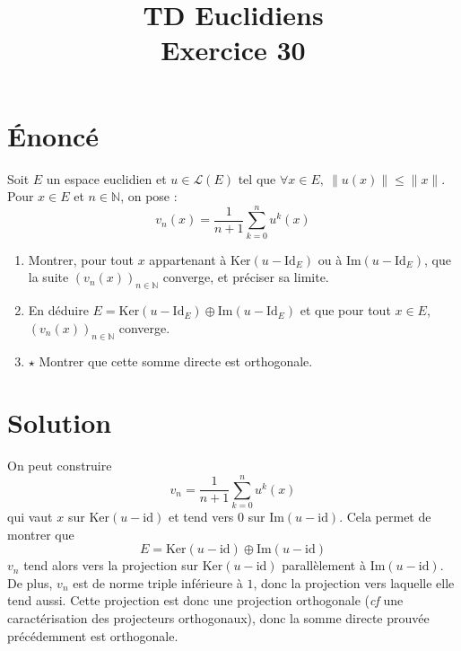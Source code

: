 \documentclass[french]{article}
\title{TD Euclidiens\\ Exercice 30}
\date{}
\newcommand{\N}{\mathbb{N}}
\renewcommand{\ker}{\text{Ker}}
\begin{document}
\maketitle

\section{Énoncé}
Soit $E$ un espace euclidien et $u\in\mathcal{L}(E)$ tel que $\forall x\in E,\ \lVert u(x)\rVert\leqslant\lVert x\rVert$. Pour $x\in E$ et $n\in\N$, on pose : $$v_n(x)=\frac{1}{n+1}\sum_{k=0}^{n}u^k(x)$$
\begin{enumerate}
	\item Montrer, pour tout $x$ appartenant à $\ker(u-\text{Id}_E)$ ou à $\text{Im}(u-\text{Id}_E)$, que la suite $(v_n(x))_{n\in\N}$ converge, et préciser sa limite.
	\item En déduire $E=\ker(u-\text{Id}_E)\oplus \text{Im}(u-\text{Id}_E)$ et que pour tout $x\in E$, $(v_n(x))_{n\in\N}$ converge.
	\item $\star$ Montrer que cette somme directe est orthogonale.
\end{enumerate}
\section{Solution}
On peut construire $$v_n=\frac{1}{n+1}\sum_{k=0}^{n}u^k(x)$$ qui vaut $x$ sur $\text{Ker}(u-\text{id})$ et tend vers 0 sur $\text{Im}(u-\text{id})$. Cela permet de montrer que $$E=\text{Ker}(u-\text{id})\oplus\text{Im}(u-\text{id})$$ $v_n$ tend alors vers la projection sur $\text{Ker}(u-\text{id})$ parallèlement à $\text{Im}(u-\text{id})$. De plus, $v_n$ est de norme triple inférieure à $1$, donc la projection vers laquelle elle tend aussi. Cette projection est donc une projection orthogonale (\textit{cf} une caractérisation des projecteurs orthogonaux), donc la somme directe prouvée précédemment est orthogonale.
\end{document}
